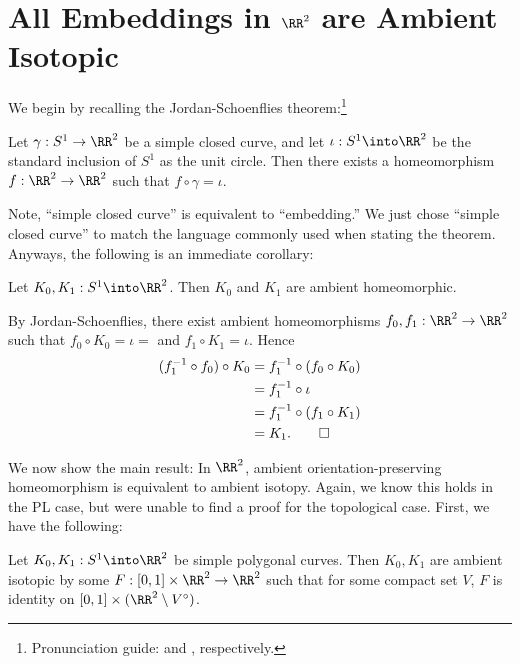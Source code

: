 \section{All Embeddings in $\RR^2$ are Ambient Isotopic}
We begin by recalling the Jordan-Schoenflies
theorem:\footnote{Pronunciation guide:  and , respectively.}
\begin{theorem}\label{thm:jordan-schoenflies}
  Let $\gamma : S^1 \to \RR^2$ be a simple closed curve, and let
  $\iota : S^1 \into \RR^2$ be the standard inclusion of $S^1$ as the
  unit circle. Then there exists a homeomorphism $f : \RR^2 \to \RR^2$
  such that $f \circ \gamma = \iota$.
\end{theorem}
Note, ``simple closed curve'' is equivalent to ``embedding.'' We just
chose ``simple closed curve'' to match the language commonly used when
stating the theorem. Anyways, the following is an immediate corollary:
\begin{corollary}\label{cor:all-embeddings-in-r2-ambient-homeomorphic}
  Let $K_0, K_1 : S^1 \into \RR^2$. Then $K_0$ and $K_1$ are ambient
  homeomorphic.
\end{corollary}
\begin{sproof}
  By Jordan-Schoenflies, there exist ambient homeomorphisms $f_0, f_1
  : \RR^2 \to \RR^2$ such that $f_0 \circ K_0 = \iota = $ and $f_1 \circ
  K_1 = \iota$. Hence
  \begin{align*}
    (f_1^{-1} \circ f_0) \circ K_0
    &= f_1^{-1} \circ (f_0 \circ K_0) \\
    &= f_1^{-1} \circ \iota \\
    &= f_1^{-1} \circ (f_1 \circ K_1)  \\
    &= K_1. \qedhere
  \end{align*}
\end{sproof}
We now show the main result: In $\RR^2$, ambient
orientation-preserving homeomorphism is equivalent to ambient isotopy.
Again, we know this holds in the PL case, but were unable to find a
proof for the topological case. First, we have the following:
\begin{lemma}\label{lem:polygonal-curves-are-equivalent}
  Let $K_0, K_1 : S^1 \into \RR^2$ be simple polygonal curves. Then
  $K_0, K_1$ are ambient isotopic by some $F : [0,1] \times \RR^2 \to
  \RR^2$ such that for some compact set $V$, $F$ is identity on $[0,1]
  \times (\RR^2 \setminus V^\circ)$.
\end{lemma}
